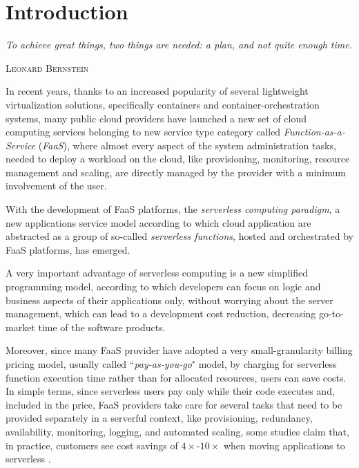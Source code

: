 \documentclass[12pt,a4paper]{report}
\newcommand{\ItalicQuotMark}[1]{``\textit{#1}"}
\begin{document}

\tableofcontents	
\listoffigures
\listoftables
\listofalgorithms
{}

\renewcommand{\textflush}{flushleft}
\setlength{}

\chapter{Introduction}\label{chapterIntro}
\epigraph{\itshape To achieve great things, two things are needed: a plan, and not quite enough time.}{\textsc{Leonard Bernstein}}

In recent years, thanks to an increased popularity of several lightweight virtualization solutions, specifically containers and container-orchestration systems, many public cloud providers have launched a new set of cloud computing services belonging to new service type category called \textit{Function-as-a-Service} (\textit{FaaS}), where almost every aspect of the system administration tasks, needed to deploy a workload on the cloud, like provisioning, monitoring, resource management and scaling, are directly managed by the provider with a minimum involvement of the user.

With the development of FaaS platforms, the \textit{serverless computing paradigm}, a new applications service model according to which cloud application are abstracted as a group of so-called \textit{serverless functions}, hosted and orchestrated by FaaS platforms, has emerged. 

A very important advantage of serverless computing is a new simplified programming model, according to which developers can focus on logic and business aspects of their applications only, without worrying about the server management, which can lead to a development cost reduction, decreasing go-to-market time of the software products.

Moreover, since many FaaS provider have adopted a very small-granularity billing pricing model, usually called \ItalicQuotMark{pay-as-you-go} model, by charging for serverless function execution time rather than for allocated resources, users can save costs. In simple terms, since serverless users pay only while their code executes and, included in the price, FaaS providers take care for several tasks that need to be provided separately in a serverful context, like  provisioning, redundancy, availability, monitoring, logging, and automated scaling, some studies claim that, in practice, customers see cost savings of $4\times$-$10\times$ when moving applications to serverless \cite{NextPhase}.
\end{document}
